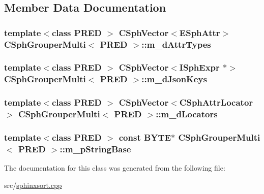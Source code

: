 \subsection{Member Data Documentation}
\hypertarget{classCSphGrouperMulti_a3aa81b108ba3b823306b1c13d9794970}{
\subsubsection[{m\-\_\-d\-Attr\-Types}]{\setlength{\rightskip}{0pt plus 5cm}template$<$class P\-R\-E\-D $>$ {\bf C\-Sph\-Vector}$<${\bf E\-Sph\-Attr}$>$ {\bf C\-Sph\-Grouper\-Multi}$<$ P\-R\-E\-D $>$\-::m\-\_\-d\-Attr\-Types\hspace{0.3cm}{\ttfamily [private]}}}\label{classCSphGrouperMulti_a3aa81b108ba3b823306b1c13d9794970}
\hypertarget{classCSphGrouperMulti_afe1e33632cebf73222002de583dfe638}{
\subsubsection[{m\-\_\-d\-Json\-Keys}]{\setlength{\rightskip}{0pt plus 5cm}template$<$class P\-R\-E\-D $>$ {\bf C\-Sph\-Vector}$<${\bf I\-Sph\-Expr} $\ast$$>$ {\bf C\-Sph\-Grouper\-Multi}$<$ P\-R\-E\-D $>$\-::m\-\_\-d\-Json\-Keys\hspace{0.3cm}{\ttfamily [private]}}}\label{classCSphGrouperMulti_afe1e33632cebf73222002de583dfe638}
\hypertarget{classCSphGrouperMulti_a5a8eeb52b7af8c2b435b50a099e5ca33}{
\subsubsection[{m\-\_\-d\-Locators}]{\setlength{\rightskip}{0pt plus 5cm}template$<$class P\-R\-E\-D $>$ {\bf C\-Sph\-Vector}$<${\bf C\-Sph\-Attr\-Locator}$>$ {\bf C\-Sph\-Grouper\-Multi}$<$ P\-R\-E\-D $>$\-::m\-\_\-d\-Locators\hspace{0.3cm}{\ttfamily [private]}}}\label{classCSphGrouperMulti_a5a8eeb52b7af8c2b435b50a099e5ca33}
\hypertarget{classCSphGrouperMulti_a4bcb26aa0140e30669879e70d7b3b029}{
\subsubsection[{m\-\_\-p\-String\-Base}]{\setlength{\rightskip}{0pt plus 5cm}template$<$class P\-R\-E\-D $>$ const {\bf B\-Y\-T\-E}$\ast$ {\bf C\-Sph\-Grouper\-Multi}$<$ P\-R\-E\-D $>$\-::m\-\_\-p\-String\-Base\hspace{0.3cm}{\ttfamily [private]}}}\label{classCSphGrouperMulti_a4bcb26aa0140e30669879e70d7b3b029}


The documentation for this class was generated from the following file\-:\begin{DoxyCompactItemize}
\item 
src/\hyperlink{sphinxsort_8cpp}{sphinxsort.\-cpp}\end{DoxyCompactItemize}
